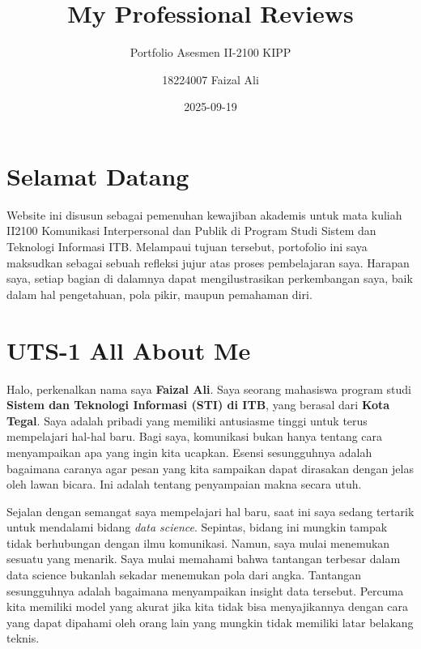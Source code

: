 \documentclass[
  letterpaper,
  DIV=11,
  numbers=noendperiod]{scrreprt}
\title{My Professional Reviews}
\subtitle{Portfolio Asesmen II-2100 KIPP}
\author{18224007 Faizal Ali}
\date{2025-09-19}
\renewcommand*\contentsname{Table of contents}
\newcommand\contentsname{Table of contents}
\begin{document}
\maketitle

\renewcommand*\contentsname{Table of contents}
{
\hypersetup{linkcolor=}
\setcounter{tocdepth}{2}
\tableofcontents
}


\chapter*{Selamat Datang}\label{selamat-datang}


Website ini disusun sebagai pemenuhan kewajiban akademis untuk mata
kuliah II2100 Komunikasi Interpersonal dan Publik di Program Studi
Sistem dan Teknologi Informasi ITB. Melampaui tujuan tersebut,
portofolio ini saya maksudkan sebagai sebuah refleksi jujur atas proses
pembelajaran saya. Harapan saya, setiap bagian di dalamnya dapat
mengilustrasikan perkembangan saya, baik dalam hal pengetahuan, pola
pikir, maupun pemahaman diri.


\chapter{UTS-1 All About Me}\label{uts-1-all-about-me}

Halo, perkenalkan nama saya \textbf{Faizal Ali}. Saya seorang mahasiswa
program studi \textbf{Sistem dan Teknologi Informasi (STI) di ITB}, yang
berasal dari \textbf{Kota Tegal}. Saya adalah pribadi yang memiliki
antusiasme tinggi untuk terus mempelajari hal-hal baru. Bagi saya,
komunikasi bukan hanya tentang cara menyampaikan apa yang ingin kita
ucapkan. Esensi sesungguhnya adalah bagaimana caranya agar pesan yang
kita sampaikan dapat dirasakan dengan jelas oleh lawan bicara. Ini
adalah tentang penyampaian makna secara utuh.

Sejalan dengan semangat saya mempelajari hal baru, saat ini saya sedang
tertarik untuk mendalami bidang \emph{data science}. Sepintas, bidang
ini mungkin tampak tidak berhubungan dengan ilmu komunikasi. Namun, saya
mulai menemukan sesuatu yang menarik. Saya mulai memahami bahwa
tantangan terbesar dalam data science bukanlah sekadar menemukan pola
dari angka. Tantangan sesungguhnya adalah bagaimana menyampaikan insight
data tersebut. Percuma kita memiliki model yang akurat jika kita tidak
bisa menyajikannya dengan cara yang dapat dipahami oleh orang lain yang
mungkin tidak memiliki latar belakang teknis.
\end{document}
